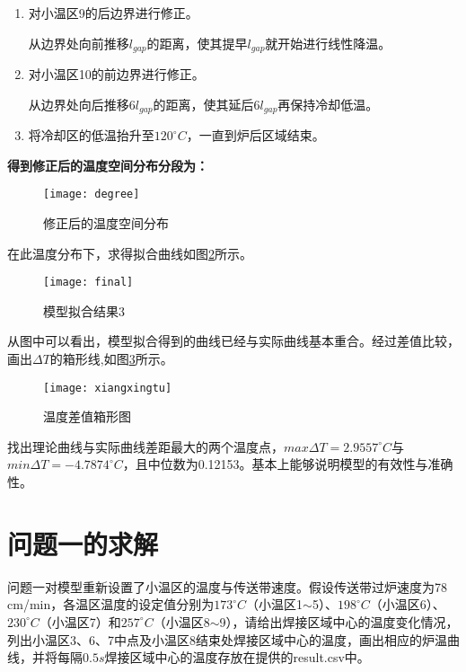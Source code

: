 \documentclass[withoutpreface,bwprint]{cumcmthesis} %
\begin{document}
\begin{enumerate}
	\item 对小温区9的后边界进行修正。
	
	从边界处向前推移$l_{gap}$的距离，使其提早$l_{gap}$就开始进行线性降温。
	\item 对小温区10的前边界进行修正。
	
	从边界处向后推移$6l_{gap}$的距离，使其延后$6l_{gap}$再保持冷却低温。
	\item 将冷却区的低温抬升至$120^{\circ}C$，一直到炉后区域结束。
	
\end{enumerate}

\textbf{得到修正后的温度空间分布分段为：}
\begin{figure}[!h]
	\centering
	\texttt{[image: degree]}
	\caption{修正后的温度空间分布}
	\label{fig:degree}
\end{figure}

\newpage

在此温度分布下，求得拟合曲线如图\ref{fig:final}所示。
\begin{figure}[!h]
	\centering
	\texttt{[image: final]}
	\caption{模型拟合结果3}
	\label{fig:final}
\end{figure}

从图中可以看出，模型拟合得到的曲线已经与实际曲线基本重合。经过差值比较，画出$\Delta T$的箱形线,如图\ref{fig:xiangxingtu}所示。
\begin{figure}[!h]
	\centering
	\texttt{[image: xiangxingtu]}
	\caption{温度差值箱形图}
	\label{fig:xiangxingtu}
\end{figure}

找出理论曲线与实际曲线差距最大的两个温度点，$max{\Delta T}=2.9557^{\circ}C$与$min{\Delta T}=-4.7874^{\circ}C$，且中位数为0.12153。基本上能够说明模型的有效性与准确性。

\newpage

\section{问题一的求解}
问题一对模型重新设置了小温区的温度与传送带速度。假设传送带过炉速度为78 cm/min，各温区温度的设定值分别为$173^{\circ}C$（小温区1$\sim$5）、$198^{\circ}C$（小温区6）、$230^{\circ}C$（小温区7）和$257^{\circ}C$（小温区8$\sim$9），请给出焊接区域中心的温度变化情况，列出小温区3、6、7中点及小温区8结束处焊接区域中心的温度，画出相应的炉温曲线，并将每隔$0.5s$焊接区域中心的温度存放在提供的result.csv中。
\end{document}
